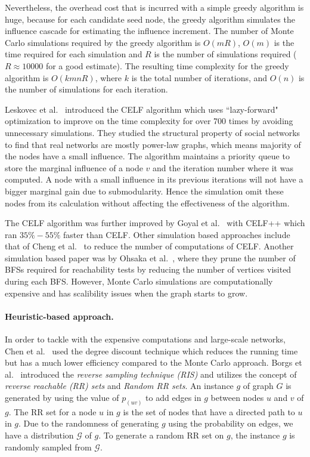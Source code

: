 Nevertheless, the overhead cost that is incurred with a simple greedy algorithm is huge, because for each candidate seed node, the greedy algorithm simulates the influence cascade for estimating the influence increment. The number of Monte Carlo simulations required by the greedy algorithm is $O(mR)$, $O(m)$ is the time required for each simulation and $R$ is the number of simulations required ($R \approx 10000$ \cite{Kempe2003} for a good estimate). The resulting time complexity for the greedy algorithm is $O(kmnR)$, where $k$ is the total number of iterations, and $O(n)$ is the number of simulations for each iteration. 

Leskovec et al.~\cite{Leskovec2007} introduced the CELF algorithm which uses ``lazy-forward" optimization to improve on the time complexity for over 700 times by avoiding unnecessary simulations. They studied the structural property of social networks to find that real networks are mostly power-law graphs, which means majority of the nodes have a small influence. The algorithm maintains a priority queue to store the marginal influence of a node $v$ and the iteration number where it was computed. A node with a small influence in its previous iterations will not have a bigger marginal gain due to submodularity. Hence the simulation omit these nodes from its calculation without affecting the effectiveness of the algorithm.

The CELF algorithm was further improved by Goyal et al.~\cite{Goyal11} with CELF++ which ran $35\%-55\%$ faster than CELF. Other simulation based approaches include that of Cheng et al.~\cite{DBLP:conf/cikm/ChengSHZC13} to reduce the number of computations of CELF. Another simulation based paper was by Ohsaka et al.~\cite{DBLP:conf/aaai/OhsakaAYK14}, where they prune the number of BFSs required for reachability tests by reducing the number of vertices visited during each BFS. However, Monte Carlo simulations are computationally expensive and has scalibility issues when the graph starts to grow. 

\paragraph{Heuristic-based approach.}

In order to tackle with the expensive computations and large-scale networks,
Chen et al.~\cite{DBLP:conf/kdd/ChenWY09} used the degree discount technique which reduces the running time but has a much lower efficiency compared to the Monte Carlo approach. Borgs et al.~\cite{Borgs2014} introduced the \textit{reverse sampling technique (RIS)} and utilizes the concept of \textit{reverse reachable (RR) sets} and \textit{Random RR sets}. An instance $g$ of graph $G$ is generated by using the value of $p_{(uv)}$ to add edges in $g$ between nodes $u$ and $v$ of $g$. The RR set for a node $u$ in $g$ is the set of nodes that have a directed path to $u$ in $g$. Due to the randomness of generating $g$ using the probability on edges, we have a distribution $\mathcal{G}$ of $g$. To generate a random RR set on $g$, the instance $g$ is randomly sampled from $\mathcal{G}$. 

